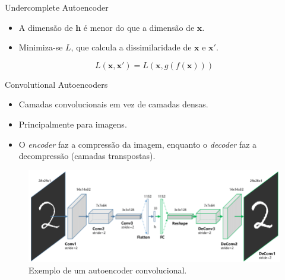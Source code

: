 \documentclass[dvipsnames]{beamer}
\begin{document}
\begin{frame}{Undercomplete Autoencoder}

	\justifying

	\begin{itemize}
		\item A dimensão de $\boldsymbol{h}$ é menor do que a dimensão de $\boldsymbol{x}$.
		\item Minimiza-se $L$, que calcula a dissimilaridade de $\boldsymbol{x}$ e $\boldsymbol{x'}$.
	\end{itemize}

	\begin{equation*}
		L(\boldsymbol{x}, \boldsymbol{x'}) = L(\boldsymbol{x}, g(f(\boldsymbol{x})))
	\end{equation*}

\end{frame}

\begin{frame}{Convolutional Autoencoders}

	\begin{itemize}
		\item Camadas convolucionais em vez de camadas densas.
		\item Principalmente para imagens.
		\item O \emph{encoder} faz a compressão da imagem, enquanto o \emph{decoder} faz a decompressão (camadas transpostas).
	\end{itemize}

	\begin{figure}
		\centering
		\includegraphics[scale=0.33]{img/conv-autoencoder.png}
		\caption{Exemplo de um autoencoder convolucional.}
	\end{figure}

\end{frame}
\end{document}
